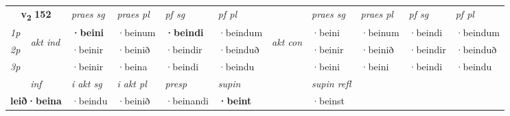 \noindent
\begin{tabular}{lllllllllll} \toprule
\multicolumn{2}{c}{\textbf{v{\textsubscript{2}}} \Large{\textbf{152}}}  &  \textit{praes sg}  & \textit{praes pl}  &\textit{ pf sg} & \textit{pf pl} &  &  \textit{praes sg}  & \textit{praes pl}  & \textit{pf sg} & \textit{pf pl } \\*
	\cmidrule{3-6} \cmidrule{8-11}
 {\textit{1p}} & \multirow{3}{*}{\begin{turn}{90}\textit{akt ind}\end{turn}} & \textbf{·beini} & ·beinum & \textbf{·beindi} & ·beindum & \multirow{3}{*}{\begin{turn}{90}\textit{akt con}\end{turn}} &·beini & ·beinum & ·beindi & ·beindum\\*
 {\textit{2p}} &  &  ·beinir  & ·beinið & ·beindir & ·beinduð & & ·beinir & ·beinið & ·beindir & ·beinduð \\*
{\textit{3p}} &  & ·beinir & ·beina & ·beindi & ·beindu & & ·beini & ·beini& ·beindi & ·beindu \\*
\cmidrule{3-6} \cmidrule{8-11}

   \multicolumn{2}{c}{\textit{inf}}  & \textit{i akt sg} & \textit{i akt pl}   & \textit{presp} & \textit{supin} && \textit{supin refl}  \\*
  \multicolumn{2}{c}{\textbf{leið\allowbreak ·beina}} & ·beindu  & ·beinið   & ·beinandi &  \textbf{·beint} && ·beinst  \\*
\end{tabular}

